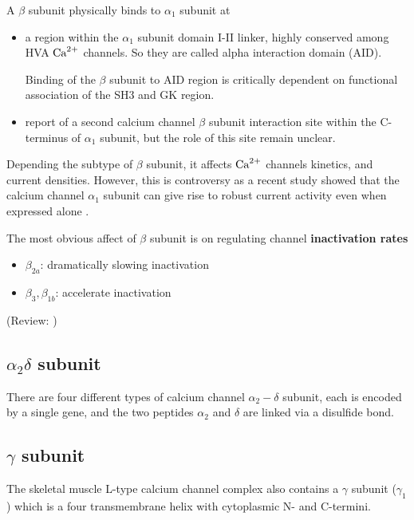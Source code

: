 A $\beta$ subunit physically binds to $\alpha_1$ subunit at
\begin{itemize}
  \item  a region within the $\alpha_1$ subunit domain I-II linker, highly
  conserved among HVA ${\text{Ca}^{2+}}$ channels. So they are called alpha interaction domain (AID).
  
  Binding of the $\beta$ subunit to AID region is critically dependent on
  functional association of the SH3 and GK region.
  
  \item report of a second calcium channel $\beta$ subunit interaction site
  within the C-terminus of $\alpha_1$ subunit, but the role of this site remain
  unclear.
\end{itemize}

Depending the subtype of $\beta$ subunit, it affects ${\text{Ca}^{2+}}$ channels kinetics,
and current densities. However, this is controversy as a recent study showed
that the calcium channel $\alpha_1$ subunit can give rise to robust current
activity even when expressed alone \citep{yasuda2004}.

The most obvious affect of $\beta$ subunit is on regulating channel {\bf
inactivation rates}
\begin{itemize}
  \item $\beta_{2a}$: dramatically slowing inactivation 
  \item $\beta_{3}, \beta_{1b}$: accelerate inactivation
\end{itemize}
(Review: \citep{kisilevsky2008})

\subsection[alpha-2-delta subunit]{$\alpha_2\delta$ subunit}
\label{sec:alpha-2-delta-subunit-VDCC}

There are four different types of calcium channel $\alpha_2-\delta$ subunit,
each is encoded by a single gene, and the two peptides $\alpha_2$ and $\delta$
are linked via a disulfide bond.

\subsection[gamma subunit]{$\gamma$ subunit}
\label{sec:gamma-subunit-VDCC}

The skeletal muscle L-type calcium channel complex also contains a $\gamma$
subunit ($\gamma_1$) which is a four transmembrane helix with cytoplasmic N- and
C-termini.

